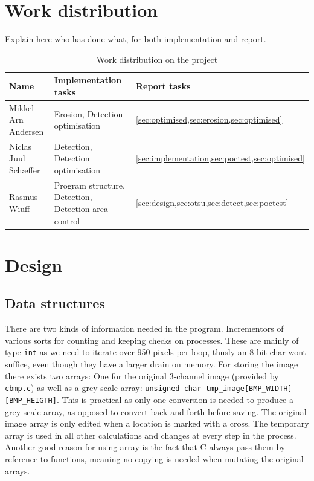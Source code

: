 \documentclass[a4paper, english]{article}
\numberwithin{equation}{section}
\begin{document}
\section{Work distribution}
Explain here who has done what, for both implementation and report.
\begin{table}[H]
    \centering
    \caption{Work distribution on the project}\label{tbl:ansvar}
    \begin{tabular}{lll}
        \toprule
        Name                 & Implementation tasks                                 & Report tasks                                        \\
        \midrule
        Mikkel Arn Andersen  & Erosion, Detection optimisation                      & \cref{sec:optimised,sec:erosion,sec:optimised}      \\
        Niclas Juul Schæffer & Detection, Detection optimisation                    & \cref{sec:implementation,sec:poctest,sec:optimised} \\
        Rasmus Wiuff         & Program structure, Detection, Detection area control & \cref{sec:design,sec:otsu,sec:detect,sec:poctest}   \\
        \bottomrule
    \end{tabular}
\end{table}
\section{Design}\label{sec:design}
\subsection{Data structures}
There are two kinds of information needed in the program. Incrementors of various sorts for counting and keeping checks on processes. These are mainly of type \texttt{int} as we need to iterate over 950 pixels per loop, thusly an 8 bit char wont suffice, even though they have a larger drain on memory. For storing the image there exists two arrays: One for the original 3-channel image (provided by \texttt{cbmp.c}) as well as a grey scale array: \texttt{unsigned char tmp\_image[BMP\_WIDTH][BMP\_HEIGTH]}.
This is practical as only one conversion is needed to produce a grey scale array, as opposed to convert back and forth before saving. The original image array is only edited when a location is marked with a cross. The temporary array is used in all other calculations and changes at every step in the process. Another good reason for using array is the fact that C always pass them by-reference to functions, meaning no copying is needed when mutating the original arrays.
\end{document}
